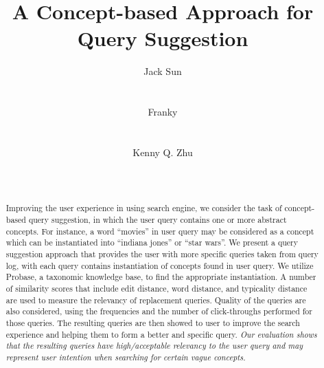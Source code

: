 \documentclass{acm_proc_article-sp}
\begin{document}
\title{A Concept-based Approach for Query Suggestion}

\author{
\alignauthor
Jack Sun\\
       \\
       \\
\alignauthor
Franky\\
       \\
       \\
\alignauthor
Kenny Q. Zhu\\
       \\
       \\
}

\maketitle
\begin{abstract}
Improving the user experience in using search engine, 
we consider the task of concept-based query suggestion, 
in which the user query contains one or more abstract 
concepts. For instance, a word ``movies'' in user query may 
be considered as a concept which can be instantiated into 
``indiana jones'' or ``star wars''. We present a query 
suggestion approach that provides the user with more 
specific queries taken from query log, with each query 
contains instantiation of concepts found in user query. 
We utilize Probase, a taxonomic knowledge base, to find 
the appropriate instantiation. A number of similarity 
scores that include edit distance, word distance, and 
typicality distance are used to measure the relevancy 
of replacement queries. Quality of the queries are also 
considered, using the frequencies and the number of 
click-throughs performed for those queries. The resulting 
queries are then showed to user to improve the search 
experience and helping them to form a better and specific 
query. \textit{Our evaluation shows that the resulting 
queries have high/acceptable relevancy to the user query 
and may represent user intention when searching for certain 
vague concepts.}
\end{abstract}

\end{document}
